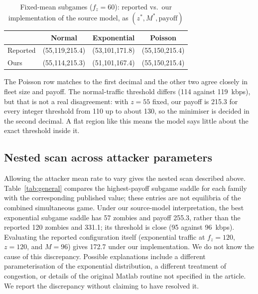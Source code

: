 \documentclass[conference]{IEEEtran}
\begin{document}
\begin{table}[t]
\caption{Fixed-mean subgames ($f_z{=}60$): reported vs.\ our implementation of the source model, as $(z^*,M^*,\text{payoff})$}
\label{tab:repro}
\centering\scriptsize
\begin{tabular}{lccc}
\toprule
 & Normal & Exponential & Poisson\\
\midrule
Reported & (55,119,215.4) & (53,101,171.8) & (55,150,215.4)\\
Ours & (55,114,215.3) & (51,101,167.4) & (55,150,215.4)\\
\bottomrule
\end{tabular}
\end{table}

The Poisson row matches to the first decimal and the other two agree closely in fleet size and payoff. The normal-traffic threshold differs (114 against 119~kbps), but that is not a real disagreement: with $z{=}55$ fixed, our payoff is 215.3 for every integer threshold from 110 up to about 130, so the minimiser is decided in the second decimal. A flat region like this means the model says little about the exact threshold inside it.

\subsection{Nested scan across attacker parameters}
Allowing the attacker mean rate to vary gives the nested scan described above. Table~\ref{tab:general} compares the highest-payoff subgame saddle for each family with the corresponding published value; these entries are not equilibria of the combined simultaneous game. Under our source-model interpretation, the best exponential subgame saddle has 57 zombies and payoff 255.3, rather than the reported 120 zombies and 331.1; its threshold is close (95 against 96~kbps). Evaluating the reported configuration itself (exponential traffic at $f_z{=}120$, $z{=}120$, and $M{=}96$) gives 172.7 under our implementation. We do not know the cause of this discrepancy. Possible explanations include a different parameterisation of the exponential distribution, a different treatment of congestion, or details of the original Matlab routine not specified in the article. We report the discrepancy without claiming to have resolved it.
\end{document}
